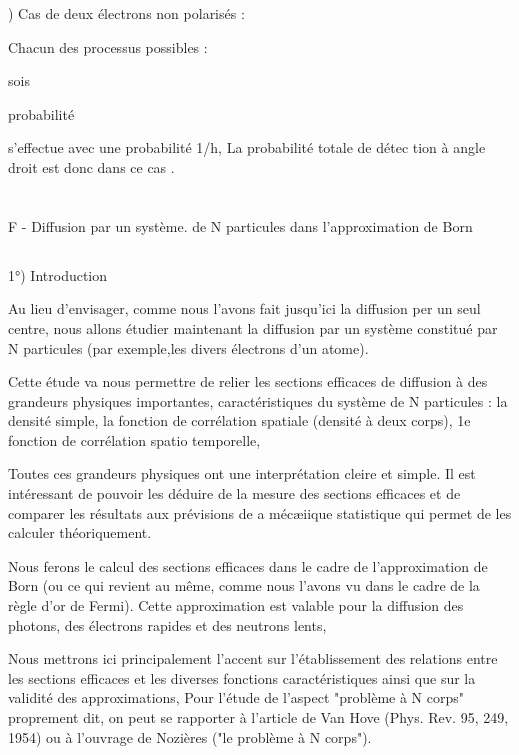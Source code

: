 {{{) Cas de deux électrons non polarisés :

Chacun des processus possibles :

sois

probabilité

s'effectue avec une probabilité 1/h, La probabilité totale de détec
tion à angle droit est donc dans ce cas .

 

\section{}%
F - Diffusion par un système. de N particules dans l'approximation de Born

\subsection{}%
1°) Introduction

Au lieu d'envisager, comme nous l'avons fait jusqu'ici la diffusion per un seul
centre, nous allons étudier maintenant la diffusion par
un système constitué par N particules (par exemple,les divers électrons d'un
atome).

Cette étude va nous permettre de relier les sections efficaces
de diffusion à des grandeurs physiques importantes, caractéristiques du système de
N particules : la densité simple, la fonction de corrélation spatiale
(densité à deux corps), 1e fonction de corrélation spatio temporelle,

Toutes ces grandeurs physiques ont une interprétation cleire et
simple. Il est intéressant de pouvoir les déduire de la mesure des sections
efficaces et de comparer les résultats aux prévisions de a mécæiique statistique
qui permet de les calculer théoriquement.

Nous ferons le calcul des sections efficaces dans le cadre de
l'approximation de Born (ou ce qui revient au même, comme nous l'avons vu dans
le cadre de la règle d'or de Fermi). Cette approximation est valable pour la
diffusion des photons, des électrons rapides et des neutrons lents,

Nous mettrons ici principalement l'accent sur l'établissement
des relations entre les sections efficaces et les diverses fonctions
caractéristiques ainsi que sur la validité des approximations, Pour
l'étude de l'aspect "problème à N corps" proprement dit, on peut se rapporter à l'article de
Van Hove (Phys. Rev. 95, 249, 1954) ou à l'ouvrage de Nozières ("le problème
à N corps").

}}}
